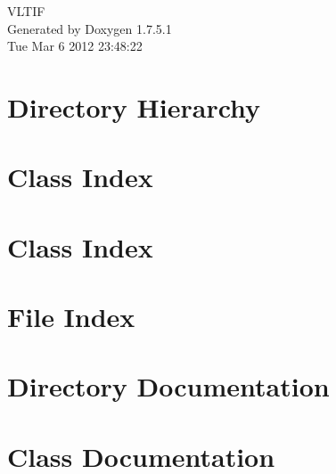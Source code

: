 \documentclass[a4paper]{book}
\begin{document}
\hypersetup{pageanchor=false,citecolor=blue}
\begin{titlepage}
\vspace*{7cm}
\begin{center}
{\Large \-V\-L\-T\-I\-F }\\
\vspace*{1cm}
{\large \-Generated by Doxygen 1.7.5.1}\\
\vspace*{0.5cm}
{\small Tue Mar 6 2012 23:48:22}\\
\end{center}
\end{titlepage}
\clearemptydoublepage
{}
\tableofcontents
\clearemptydoublepage
{}
\hypersetup{pageanchor=true,citecolor=blue}
\chapter{\-Directory \-Hierarchy}

\chapter{\-Class \-Index}

\chapter{\-Class \-Index}

\chapter{\-File \-Index}

\chapter{\-Directory \-Documentation}





\chapter{\-Class \-Documentation}













\end{document}
